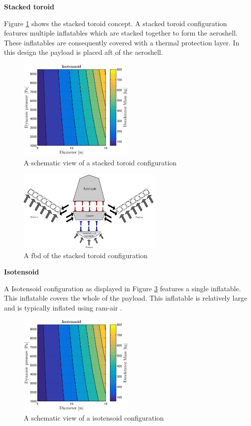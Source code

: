 \textbf{Stacked toroid}

Figure \ref{fig:conc_stacked} shows the stacked toroid concept. A stacked toroid configuration features multiple inflatables which are stacked together to form the aeroshell. These inflatables are consequently covered with a thermal protection layer. In this design the payload is placed aft of the aeroshell.\

\begin{figure}[H]
\centering
\includegraphics[width = 0.5\textwidth]{Figure/ISO_comp.eps}
\caption{A schematic view of a stacked toroid configuration}
\label{fig:conc_stacked}
\end{figure}

\begin{figure}[H]
\centering
\includegraphics[width = 0.62\textwidth]{Figure/FBD_stacked.eps}
\caption{A \gls{fbd} of the stacked toroid configuration}
\label{fig:fbd_stacked}
\end{figure}


\textbf{Isotensoid}

A Isotensoid configuration as displayed in Figure \ref{fig:conc_iso} features a single inflatable. This inflatable covers the whole of the payload. This inflatable is relatively large and is typically inflated using ram-air \cite{Smith2011}. 

\begin{figure}[H]
\centering
\includegraphics[width = 0.5\textwidth]{Figure/ISO_comp.eps}
\caption{A schematic view of a isotensoid configuration}
\label{fig:conc_iso}
\end{figure}

